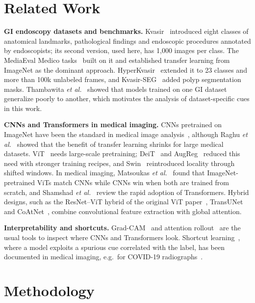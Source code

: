 \documentclass[conference]{IEEEtran}
\begin{document}
\section{Related Work}
\textbf{GI endoscopy datasets and benchmarks.} Kvasir~\cite{pogorelov2017kvasir} introduced eight classes of anatomical
landmarks, pathological findings and endoscopic procedures annotated by endoscopists; its second version, used here,
has 1{,}000 images per class. The MediaEval Medico tasks~\cite{pogorelov2018medico} built on it and established
transfer learning from ImageNet as the dominant approach. HyperKvasir~\cite{borgli2020hyperkvasir} extended it to 23
classes and more than 100k unlabeled frames, and Kvasir-SEG~\cite{jha2020kvasirseg} added polyp segmentation masks.
Thambawita \emph{et al.}~\cite{thambawita2020extensive} showed that models trained on one GI dataset generalize poorly to
another, which motivates the analysis of dataset-specific cues in this work.

\textbf{CNNs and Transformers in medical imaging.} CNNs pretrained on ImageNet have been the standard in medical image
analysis~\cite{litjens2017survey}, although Raghu \emph{et al.}~\cite{raghu2019transfusion} showed that the benefit of
transfer learning shrinks for large medical datasets. ViT~\cite{dosovitskiy2021vit} needs large-scale pretraining;
DeiT~\cite{touvron2021deit} and AugReg~\cite{steiner2022augreg} reduced this need with stronger training recipes, and
Swin~\cite{liu2021swin} reintroduced locality through shifted windows. In medical imaging, Matsoukas
\emph{et al.}~\cite{matsoukas2021time} found that ImageNet-pretrained ViTs match CNNs while CNNs win when both are trained
from scratch, and Shamshad \emph{et al.}~\cite{shamshad2023survey} review the rapid adoption of Transformers.
Hybrid designs, such as the ResNet--ViT hybrid of the original ViT paper~\cite{dosovitskiy2021vit},
TransUNet~\cite{chen2021transunet} and CoAtNet~\cite{dai2021coatnet}, combine convolutional feature extraction with
global attention.

\textbf{Interpretability and shortcuts.} Grad-CAM~\cite{selvaraju2017gradcam} and attention
rollout~\cite{abnar2020rollout} are the usual tools to inspect where CNNs and Transformers look. Shortcut
learning~\cite{geirhos2020shortcut}, where a model exploits a spurious cue correlated with the label, has been documented
in medical imaging, e.g.\ for COVID-19 radiographs~\cite{degrave2021covid}.

\section{Methodology}
\end{document}
